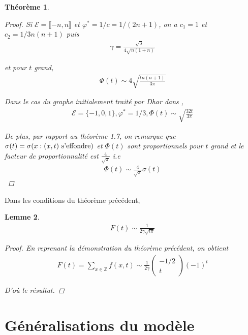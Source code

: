 \documentclass{article}
\newtheorem{theorem}{Théorème}[section]
\newtheorem{lemma}[theorem]{Lemme}
\begin{document}
\begin{theorem}
\begin{proof}
Si $\mathcal{E}=\llbracket-n,n\rrbracket$ et $\varphi^*=1/c=1/(2n+1)$, on a $c_1=1$ et $c_2=1/3 n(n+1)$ puis 
\begin{align*}
	\gamma=\frac{\sqrt{3}}{4\sqrt{n(1+n)}}
\end{align*}

et pour $t$ grand, 
\begin{align*}
	\Phi(t) \sim 4\sqrt{\frac{tn(n+1)}{3\pi}}
\end{align*} 

Dans le cas du graphe initialement traité par Dhar dans \cite{DHARBIS},  
			\begin{align*}
			\mathcal{E} = \{-1,0,1\}, \varphi^* = 1/3,  \Phi(t) \sim \sqrt{\frac{32 t}{3\pi}}\end{align*}

			De plus, par rapport au théorème 1.7, on remarque que $\sigma(t) = \sigma(x : (x,t) \textup{ s'effondre})$ et $\Phi(t)$ sont proportionnels pour $t$ grand et le facteur de proportionnalité est $\frac{4}{\sqrt{\pi}}$ i.e \begin{align*}
			\Phi(t) \sim \frac{4}{\sqrt{\pi}} \sigma(t)\end{align*}
		\end{proof}\end{theorem}
Dans les conditions du théorème précédent,
		\begin{lemma}
			\begin{align*}
			F(t) \sim \frac{1}{2\gamma \sqrt{t \pi}}\end{align*}
		\begin{proof}
		En reprenant la démonstration du théorème précédent, on obtient \begin{align*}
			F(t) = \sum_{x\in\mathbb{Z}}f(x,t) \sim \frac{1}{2\gamma}\begin{pmatrix}-1/2\\t\end{pmatrix}(-1)^t
		\end{align*}

		D'où le résultat.
	\end{proof}
\end{lemma}
\section{Généralisations du modèle}
\end{document}
